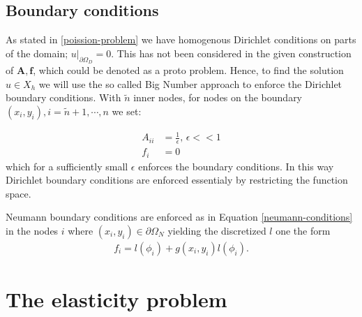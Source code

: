 \documentclass[5pt,a4paper,english]{elsarticle}%
\newcommand{\restr}[2]{\ensuremath{\left.#1\right|_{#2}}}
\begin{document}
\subsection{Boundary conditions}
As stated in \eqref{poission-problem} we have homogenous Dirichlet conditions on parts of the domain; $\restr{u}{\partial \Omega_D} =  0 $. This has not been considered in the given construction of $\bm A,\bm f$, which could be denoted as a proto problem. Hence, to find the solution $u \in X_h$ we will use the so called Big Number approach \cite[p. 16]{Lecture_Note_4} to enforce the Dirichlet boundary conditions. With $\tilde n$ inner nodes, for nodes on the boundary $(x_i,y_i), i= \tilde n +1,\cdots, n$ we set:


\begin{equation*}
    \begin{aligned}
    A_{ii} &= \frac{1}{\epsilon}, \, \epsilon << 1 \\
    f_i &= 0
    \end{aligned}
\end{equation*}
which for a sufficiently small $\epsilon$ enforces the boundary conditions. In this way Dirichlet boundary conditions are enforced essentialy by restricting the function space. 

Neumann boundary conditions are enforced as in Equation \eqref{neumann-conditions} in the nodes $i$ where $(x_i,y_i) \in \partial \Omega_N$ yielding the discretized $l$ one the form
\begin{align}
    f_i = l(\phi_i) + g(x_i,y_i)l(\phi_i).
\end{align}


\section{The elasticity problem } \label{seq-elasticity}
\end{document}
